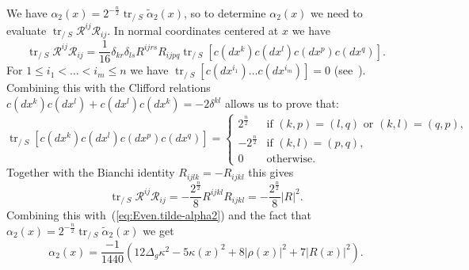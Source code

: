\documentclass[leqno, 10pt]{amsart}
\theoremstyle{remark}
\begin{document}
We have $\alpha_{2}(x)=2^{-\frac{n}{2}}{{\operatorname{{tr}}}}_{\ensuremath{{/\!\!\!\!\!\;S}}}\tilde{\alpha}_{2}(x)$, so to determine $\alpha_{2}(x)$ we need to evaluate 
$ {{\operatorname{{tr}}}}_{\ensuremath{{/\!\!\!\!\!\;S}}}{\ensuremath{\mathcal{R}}}^{ij}{\ensuremath{\mathcal{R}}}_{ij}$. In normal coordinates centered at $x$ we have
\begin{equation}
     {{\operatorname{{tr}}}}_{\ensuremath{{/\!\!\!\!\!\;S}}}{\ensuremath{\mathcal{R}}}^{ij}{\ensuremath{\mathcal{R}}}_{ij}= \frac{1}{16}\delta_{kr}\delta_{ls} R^{ijrs}R_{ijpq}{{\operatorname{{tr}}}}_{\ensuremath{{/\!\!\!\!\!\;S}}}[c(dx^{k})c(dx^{l})c(dx^{p})c(dx^{q})].     
\end{equation}
For $1\leq i_{1}<\ldots<i_{m}\leq n$ we have ${{\operatorname{{tr}}}}_{\ensuremath{{/\!\!\!\!\!\;S}}}\left[c(dx^{i_{1}})\ldots 
c(dx^{i_{m}})\right]=0$ (see~\cite[Thm.~I.8]{Ge:POSASIT}). Combining this with the Clifford relations 
$c(dx^{k})c(dx^{l})+c(dx^{l})c(dx^{k})=-2\delta^{kl}$ allows us to prove that:
\begin{equation}
    {{\operatorname{{tr}}}}_{\ensuremath{{/\!\!\!\!\!\;S}}}[c(dx^{k})c(dx^{l})c(dx^{p})c(dx^{q})] =\left\{ 
    \begin{array}{cl}
        2^{\frac{n}{2}}& \text{if $(k,p)=(l,q)$ or $(k,l)=(q,p)$},\\
        - 2^{\frac{n}{2}} & \text{if $(k,l)=(p,q)$}, \\
        0 & \text{otherwise}.
    \end{array}\right.
\end{equation}
Together with the Bianchi identity $R_{ijlk}=-R_{ijkl}$ this gives 
\begin{equation}
      {{\operatorname{{tr}}}}_{\ensuremath{{/\!\!\!\!\!\;S}}}{\ensuremath{\mathcal{R}}}^{ij}{\ensuremath{\mathcal{R}}}_{ij}= -\frac{2^{\frac{n}{2}}}{8}R^{ijkl}R_{ijkl} = -\frac{2^{\frac{n}{2}}}{8}|R|^{2}.
\end{equation}
Combining this with~(\ref{eq:Even.tilde-alpha2}) and the fact that $ \alpha_{2}(x)=2^{-\frac{n}{2}}{{\operatorname{{tr}}}}_{\ensuremath{{/\!\!\!\!\!\;S}}}\tilde{\alpha}_{2}(x)$ we get
\begin{equation}
    \alpha_{2}(x)= \frac{-1}{1440}\left( 12 \Delta_{g}\kappa^{2}-5\kappa(x)^{2}+8|\rho(x)|^{2}+7|R(x)|^{2}\right).
    \label{eq:Even.formula-alpha2}
\end{equation}
\end{document}
